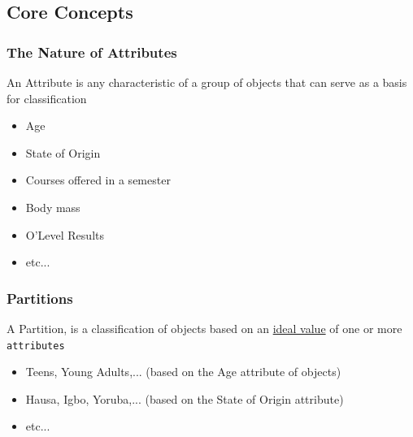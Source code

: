 \documentclass[10pt]{beamer}
\begin{document}
		\subsection{Core Concepts}
			\begin{frame}
				\frametitle{The Nature of Attributes}
				\begin{definition}
					An Attribute is any characteristic of a group of objects that can serve as a basis for classification
				\end{definition}
				\begin{example}
					\begin{itemize}
						\item Age
						\item State of Origin
						\item Courses offered in a semester
						\item Body mass
						\item O'Level Results
						\item etc...
					\end{itemize}
				\end{example}
			\end{frame}
			\begin{frame}
				\frametitle{Partitions}
				\begin{definition}
					A Partition, is a classification of objects based on an \underline{ideal value} of one or more \texttt{attributes}
				\end{definition}
				\begin{example}
					\begin{itemize}
						\item Teens, Young Adults,... (based on the Age attribute of objects)
						\item Hausa, Igbo, Yoruba,... (based on the State of Origin attribute)
						\item etc...
					\end{itemize}
				\end{example}
			\end{frame}
\end{document}
